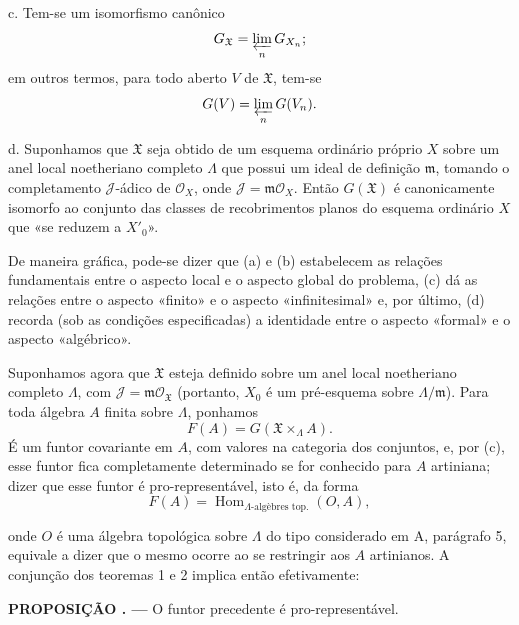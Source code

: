 \documentclass[11pt,twoside,openany]{book}
\numberwithin{equation}{section}
\newcommand{\src}[1]{%
  \phantomsection\hypertarget{src:#1}{}%
  \marginpar{\raggedleft\footnotesize\sffamily #1}%
}
\theoremstyle{plain}
\theoremstyle{definition}
\theoremstyle{remark}
\newcommand{\result}[2]{%
  \par\medskip\noindent\textbf{#1%
  \if\relax\detokenize{#2}\relax\else\space#2\fi. ---}\enspace
}
\newcommand{\FgaUnitKey}{frontmatter}
\renewcommand{\src}[1]{%
  \phantomsection\hypertarget{src:\FgaUnitKey:#1}{}%
  \marginpar{\raggedleft\footnotesize\sffamily #1}%
}
\begin{document}
\noindent c. Tem-se um isomorfismo canônico
\[
  G_{\mathfrak X}=\varprojlim_nG_{X_n} ;
\]
em outros termos, para todo aberto $V$ de $\mathfrak X$, tem-se
\[
  G(V)=\varprojlim_nG(V_n).
\]

\noindent d. Suponhamos que $\mathfrak X$ seja obtido de um esquema ordinário
próprio $X$ sobre um anel local noetheriano completo $\Lambda$ que possui um
ideal de definição $\mathfrak m$, tomando o completamento $\mathcal J$-ádico de
$\mathcal O_X$, onde $\mathcal J=\mathfrak m\mathcal O_X$. Então
$G(\mathfrak X)$ é canonicamente isomorfo ao conjunto das classes de
recobrimentos planos do esquema ordinário $X$ que «se reduzem a $X'_0$».

De maneira gráfica, pode-se dizer que (a) e (b) estabelecem as relações
fundamentais entre o aspecto local e o aspecto global do problema, (c) dá
as relações entre o aspecto «finito» e o aspecto «infinitesimal» e, por
último, (d) recorda (sob as condições especificadas) a identidade entre o
aspecto «formal» e o aspecto «algébrico».

Suponhamos agora que $\mathfrak X$ esteja definido sobre um anel local
noetheriano completo $\Lambda$, com
$\mathcal J=\mathfrak m\mathcal O_{\mathfrak X}$ (portanto, $X_0$ é um
pré-esquema sobre $\Lambda/\mathfrak m$). Para toda álgebra $A$ finita sobre
$\Lambda$, ponhamos
\[
  F(A)=G(\mathfrak X\times_\Lambda A).
\]
É um funtor covariante em $A$, com valores na categoria dos conjuntos,
e, por (c), esse funtor fica completamente determinado se for conhecido para $A$
artiniana; dizer que esse funtor é pro-representável, isto é, da forma
\[
  F(A)=\operatorname{Hom}_{\Lambda\text{-algèbres top.}}(O,A),
\]

\src{389}
onde $O$ é uma álgebra topológica sobre $\Lambda$ do tipo considerado em A,
parágrafo 5, equivale a dizer que o mesmo ocorre ao se restringir aos $A$
artinianos. A conjunção dos teoremas 1 e 2 implica então efetivamente:

\result{PROPOSIÇÃO}{5.1} O funtor precedente é pro-representável.
\end{document}

